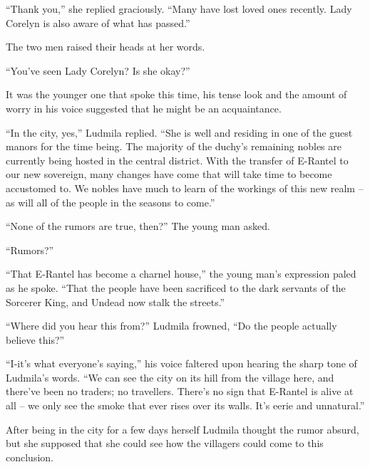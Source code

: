  

“Thank you,” she replied graciously. “Many have lost loved ones recently. Lady Corelyn is also aware of what has passed.”

 

The two men raised their heads at her words.

 

“You’ve seen Lady Corelyn? Is she okay?”

 

It was the younger one that spoke this time, his tense look and the amount of worry in his voice suggested that he might be an acquaintance.

 

“In the city, yes,” Ludmila replied. “She is well and residing in one of the guest manors for the time being. The majority of the duchy’s remaining nobles are currently being hosted in the central district. With the transfer of E-Rantel to our new sovereign, many changes have come that will take time to become accustomed to. We nobles have much to learn of the workings of this new realm – as will all of the people in the seasons to come.”

 

“None of the rumors are true, then?” The young man asked.

 

“Rumors?”

 

“That E-Rantel has become a charnel house,” the young man’s expression paled as he spoke. “That the people have been sacrificed to the dark servants of the Sorcerer King, and Undead now stalk the streets.”

 

“Where did you hear this from?” Ludmila frowned, “Do the people actually believe this?”

 

“I-it’s what everyone’s saying,” his voice faltered upon hearing the sharp tone of Ludmila’s words. “We can see the city on its hill from the village here, and there’ve been no traders; no travellers. There’s no sign that E-Rantel is alive at all – we only see the smoke that ever rises over its walls. It’s eerie and unnatural.”

 

After being in the city for a few days herself Ludmila thought the rumor absurd, but she supposed that she could see how the villagers could come to this conclusion.

 

